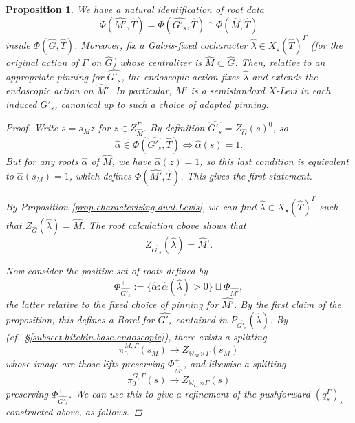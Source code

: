 \documentclass[openany]{amsbook}
\newtheorem{proposition}[theorem]{Proposition}
\theoremstyle{definition}
\theoremstyle{remark}
\numberwithin{equation}{section}
\newcommand{\W}{\mathbb{W}}
\renewcommand{\-}{\operatorname{-}}
\begin{document}
\begin{proposition}\label{prop.ind.G'.cont.M'.Levi}
    We have a natural identification of root data
    $$
        \Phi(\widehat{M'}, \widehat{T}) = \Phi(\widehat{G'_s}, \widehat{T}) \cap \Phi(\widehat{M}, \widehat{T})
    $$
    inside $\Phi(\widehat{G}, \widehat{T})$. Moreover, fix a Galois-fixed cocharacter $\widehat{\lambda} \in X_\star(\widehat{T})^\Gamma$ (for the original action of $\Gamma$ on $\widehat{G}$) whose centralizer is $\widehat{M} \subset \widehat{G}$. Then, relative to an appropriate pinning for $\widehat{G'_s}$, the endoscopic action fixes $\widehat{\lambda}$ and extends the endoscopic action on $\widehat{M}'$. In particular, $M'$ is a semistandard $X$-Levi in each induced $G'_s$, canonical up to such a choice of adapted pinning.
    \begin{proof}
        Write $s = s_M z$ for $z \in Z_{\widehat{M}}^\Gamma$. By definition $\widehat{G'_s} = Z_{\widehat{G}}(s)^0$, so 
        $$
            \widehat{\alpha} \in \Phi(\widehat{G'_s}, \widehat{T}) \Longleftrightarrow \widehat{\alpha}(s) = 1.
        $$
        But for any roots $\widehat{\alpha}$ of $\widehat{M}$, we have $\widehat{\alpha}(z) = 1$, so this last condition is equivalent to $\widehat{\alpha}(s_M) = 1$, which defines $\Phi(\widehat{M'}, \widehat{T})$. This gives the first statement. 

        By Proposition \ref{prop.characterizing.dual.Levis}, we can find $\widehat{\lambda} \in X_\star(\widehat{T})^{\Gamma}$ such that $Z_{\widehat{G}}(\widehat{\lambda}) = \widehat{M}$. The root calculation above shows that
        $$
            Z_{\widehat{G'_s}}(\widehat{\lambda}) = \widehat{M}'.
        $$

        Now consider the positive set of roots defined by
        $$
            \Phi^+_{\widehat{G'_s}} := \{\widehat{\alpha} : \widehat{\alpha}(\widehat{\lambda}) > 0\} \sqcup \Phi^+_{\widehat{M'}},
        $$
        the latter relative to the fixed choice of pinning for $\widehat{M'}$. By the first claim of the proposition, this defines a Borel for $\widehat{G'_s}$ contained in $P_{\widehat{G'_s}}(\widehat{\lambda})$. By \cite[Lemme 10.1]{ngoendo} (cf.\ \S \ref{subsect.hitchin.base.endoscopic}), there exists a splitting 
        \begin{equation}
        \pi_0^{M,\Gamma}(s_M) \to Z_{\W_M \rtimes \Gamma}(s_M)
        \end{equation}
        whose image are those lifts preserving $\Phi^+_{\widehat{M'}}$, and likewise a splitting
        \begin{equation}
            \pi_0^{G, \Gamma}(s) \to Z_{\W_G \rtimes \Gamma}(s)\label{eqn.end.splitting.Weyl}
        \end{equation}
        preserving $\Phi^+_{\widehat{G'_s}}$. We can use this to give a refinement of the pushforward $(q_s^\Gamma)_\star$ constructed above, as follows. 
        

\end{proof}
\end{proposition}
\end{document}
